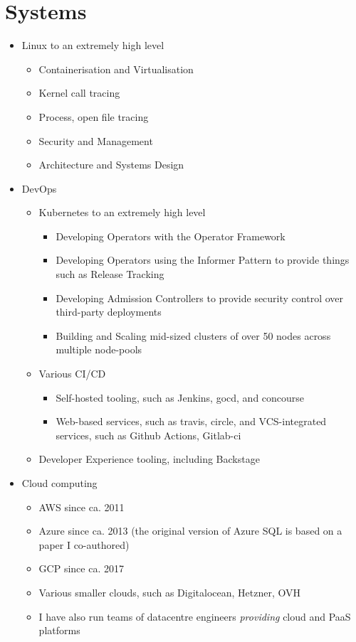 \section{Systems}

\begin{itemize}
\item Linux to an extremely high level
  \begin{itemize}
  \item Containerisation and Virtualisation
  \item Kernel call tracing
  \item Process, open file tracing
  \item Security and Management
  \item Architecture and Systems Design
  \end{itemize}
\item DevOps
  \begin{itemize}
  \item Kubernetes to an extremely high level
    \begin{itemize}
    \item Developing Operators with the Operator Framework
    \item Developing Operators using the Informer Pattern to provide things such as Release Tracking
    \item Developing Admission Controllers to provide security control over third-party deployments
    \item Building and Scaling mid-sized clusters of over 50 nodes across multiple node-pools
    \end{itemize}
  \item Various CI/CD
    \begin{itemize}
    \item Self-hosted tooling, such as Jenkins, gocd, and concourse
    \item Web-based services, such as travis, circle, and VCS-integrated services, such as Github Actions, Gitlab-ci
    \end{itemize}
  \item Developer Experience tooling, including Backstage
  \end{itemize}
\item Cloud computing
  \begin{itemize}
  \item AWS since ca. 2011
  \item Azure since ca. 2013 (the original version of Azure SQL is based on a paper I co-authored)
  \item GCP since ca. 2017
  \item Various smaller clouds, such as Digitalocean, Hetzner, OVH
  \item I have also run teams of datacentre engineers \textit{providing} cloud and PaaS platforms
  \end{itemize}
\end{itemize}
